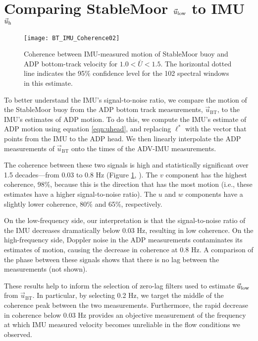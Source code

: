 \section{Comparing StableMoor $\vec{u}_\mathrm{low}$ to IMU $\vec{u}_\mathrm{h}$}
\label{apdx:ulow}

\def\ubt{\ensuremath{\vec{u}_\mathrm{BT}}}

\begin{figure}[t]
  \centering
  \texttt{[image: BT\_IMU\_Coherence02]}
  \caption{Coherence between IMU-measured motion of StableMoor buoy and ADP bottom-track velocity for $1.0<\bar{U}<1.5$. The horizontal dotted line indicates the 95\% confidence level for the 102 spectral windows in this estimate.}
  \label{fig:SM_coh}
\end{figure}
To better understand the IMU's signal-to-noise ratio, we compare the motion of the StableMoor buoy from the ADP bottom track measurements, $\ubt$, to the IMU's estimates of ADP motion. To do this, we compute the IMU's estimate of ADP motion using equation \eqref{eqn:uhead}, and replacing $\ell^{*}$ with the vector that points from the IMU to the ADP head. We then linearly interpolate the ADP measurements of $\ubt$ onto the times of the ADV-IMU measurements.

The coherence between these two signals is high and statistically significant over 1.5 decades---from 0.03 to 0.8 Hz (Figure \ref{fig:SM_coh}, \citealt[][]{Priestley1981}). The $v$ component has the highest coherence, 98\%, because this is the direction that has the most motion (i.e., these estimates have a higher signal-to-noise ratio).  The $u$ and $w$ components have a slightly lower coherence, 80\% and 65\%, respectively.

On the low-frequency side, our interpretation is that the signal-to-noise ratio of the IMU decreases dramatically below 0.03 Hz, resulting in low coherence. On the high-frequency side, Doppler noise in the ADP measurements contaminates its estimates of motion, causing the decrease in coherence at 0.8 Hz. A comparison of the phase between these signals shows that there is no lag between the measurements (not shown).


These results help to inform the selection of zero-lag filters used to estimate $\vec{u}_\mathrm{low}$ from $\ubt$. In particular, by selecting 0.2 Hz, we target the middle of the coherence peak between the two measurements. Furthermore, the rapid decrease in coherence below 0.03 Hz provides an objective measurement of the frequency at which IMU measured velocity becomes unreliable in the flow conditions we observed. 



